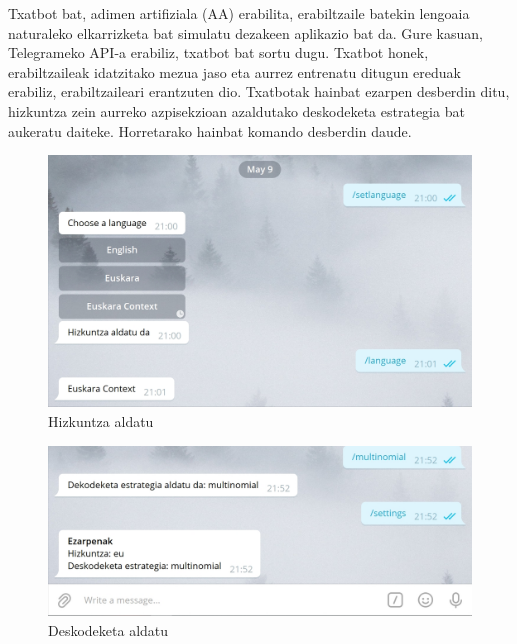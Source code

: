 \documentclass[11pt,a4paper]{article}
\begin{document}
Txatbot bat, adimen artifiziala (AA) erabilita, erabiltzaile batekin lengoaia naturaleko elkarrizketa bat simulatu dezakeen aplikazio bat da.
Gure kasuan, Telegrameko API-a erabiliz, txatbot bat sortu dugu. Txatbot honek, erabiltzaileak idatzitako mezua jaso eta aurrez entrenatu ditugun ereduak erabiliz, erabiltzaileari erantzuten dio.
Txatbotak hainbat ezarpen desberdin ditu, hizkuntza zein aurreko azpisekzioan azaldutako deskodeketa estrategia bat aukeratu daiteke. Horretarako hainbat komando desberdin daude.

\begin{figure}
    \centering
    \includegraphics[width=\linewidth]{images/bot_language.jpg}
    \caption{Hizkuntza aldatu}
    \label{fig:hizkuntza}
\end{figure}

\begin{figure}
    \centering
    \includegraphics[width=\linewidth]{images/bot_decoding.jpg}
    \caption{Deskodeketa aldatu}
    \label{fig:hizkuntza2}
\end{figure}
\end{document}
